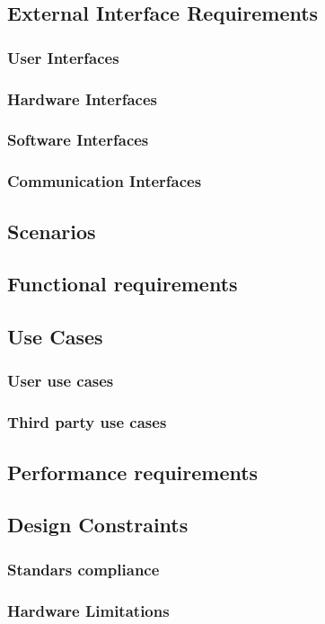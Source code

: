 \documentclass{article}
\begin{document}
\subsection{External Interface Requirements}
\subsubsection{User Interfaces}
\subsubsection{Hardware Interfaces}
\subsubsection{Software Interfaces}
\subsubsection{Communication Interfaces}
\subsection{Scenarios}
\subsection{Functional requirements}
\subsection{Use Cases}
\subsubsection{User use cases}
\subsubsection{Third party use cases}
\subsection{Performance requirements}
\subsection{Design Constraints}
\subsubsection{Standars compliance}
\subsubsection{Hardware Limitations}
\end{document}
